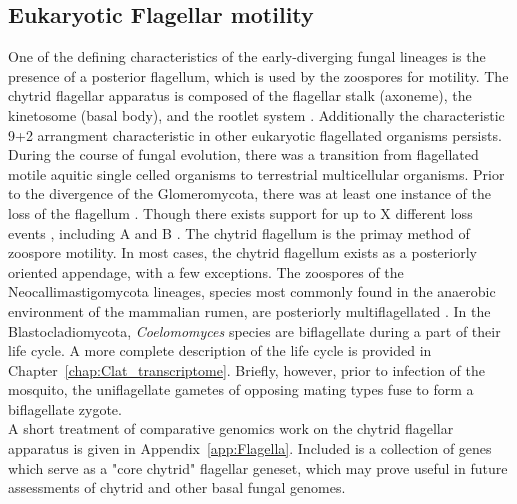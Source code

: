\subsection{Eukaryotic Flagellar motility}
One of the defining characteristics of the early-diverging fungal lineages is the presence of a posterior flagellum, which is used by the zoospores for motility. The chytrid flagellar apparatus is composed of the flagellar stalk (axoneme), the kinetosome (basal body), and the rootlet system \cite{Barr1981}. Additionally the characteristic 9+2 arrangment characteristic in other eukaryotic flagellated organisms persists.\\
\indent During the course of fungal evolution, there was a transition from flagellated motile aquitic single celled organisms to terrestrial multicellular organisms. Prior to the divergence of the Glomeromycota, there was at least one instance of the loss of the flagellum \cite{}. Though there exists support for up to X different loss events \cite{}, including A \cite{} and B \cite{}.
\indent The chytrid flagellum is the primay method of zoospore motility. In most cases, the chytrid flagellum exists as a posteriorly oriented appendage, with a few exceptions. The zoospores of the Neocallimastigomycota lineages, species most commonly found in the anaerobic environment of the mammalian rumen, are posteriorly multiflagellated \cite{}. In the Blastocladiomycota, \textit{Coelomomyces} species are biflagellate during a part of their life cycle. A more complete description of the life cycle is provided in Chapter~\ref{chap:Clat_transcriptome}. Briefly, however, prior to infection of the mosquito, the uniflagellate gametes of opposing mating types fuse to form a biflagellate zygote. \cite{}\\ 
\indent A short treatment of comparative genomics work on the chytrid flagellar apparatus is given in Appendix~\ref{app:Flagella}. Included is a collection of genes which serve as a "core chytrid" flagellar geneset, which may prove useful in future assessments of chytrid and other basal fungal genomes.\\
